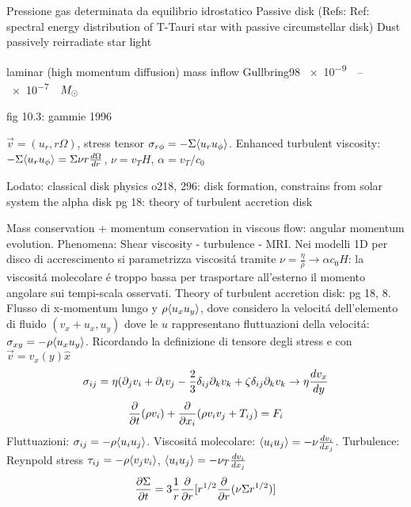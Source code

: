 \begin{workout}
	Pressione gas determinata da equilibrio idrostatico
	Passive disk (Refs: Ref: spectral energy distribution of T-Tauri star with passive circumstellar disk)	Dust passively reirradiate star light
\end{workout}

\begin{workout}
	laminar (high momentum diffusion)
	mass inflow Gullbring98 \SIrange{e-9}{e-7}{\per\year}$\msun{}$
\end{workout}
\begin{workout}[MRI]
	fig 10.3:
	gammie 1996
\end{workout}

\begin{workout}
	$\vec{v}=(u_r,r\Omega)$, stress tensor $\sigma_{r\phi}=-\Sigma\exv{u_ru_{\phi}}$.
	Enhanced turbulent viscosity: $-\Sigma\exv{u_ru_{\phi}}=\Sigma\nu r\TDy{r}{\Omega}$, $\nu=v_TH$, $\alpha=v_T/c_0$
\end{workout}

\begin{workout}
	Lodato: classical disk physics
	o218, 296: disk formation, constrains from solar system
	the alpha disk pg 18: theory of turbulent accretion disk
\end{workout}


\begin{workout}
	Mass conservation + momentum conservation in viscous flow: angular momentum evolution. Phenomena: Shear viscosity - turbulence - MRI.
	Nei modelli 1D per disco di accrescimento si parametrizza viscosit\'a tramite $\nu=\frac{\eta}{\rho}\to\alpha c_0 H$: la viscosit\'a molecolare \'e troppo bassa  per trasportare all'esterno il momento angolare sui tempi-scala osservati.
	Theory of turbulent accretion disk: pg 18, 8.
	Flusso di x-momentum lungo y $\rho\exv{u_xu_y}$, dove considero la velocit\'a dell'elemento di fluido $(v_x+u_x,u_y)$ dove le $u$ rappresentano fluttuazioni della velocit\'a: $\sigma_{xy}=-\rho\exv{u_xu_y}$.
	Ricordando la definizione di tensore degli stress e con $\vec{v}=v_x(y)\hat{x}$
	\begin{equation}
	\sigma_{ij}=\eta(\partial_jv_i+\partial_iv_j-\frac{2}{3}\delta_{ij}\partial_kv_k+\zeta\delta_{ij}\partial_kv_k \to \eta\TDy{y}{v_x}
	\end{equation}
	\begin{equation}
	\PDof{t}(\rho v_i)+\PDof{x_i}(\rho v_iv_j+T_{ij})=F_i
	\end{equation}
	Fluttuazioni: $\sigma_{ij}=-\rho\exv{u_iu_j}$.
	Viscosit\'a molecolare: $\exv{u_iu_j}=-\nu\TDy{x_j}{v_i}$.
	Turbulence: Reynpold stress $\tau_{ij}=-\rho\exv{v_jv_i}$, $\exv{u_iu_j}=-\nu_T\TDy{x_j}{v_i}$
	\begin{equation}
	\PDy{t}{\Sigma}=3\frac{1}{r}\PDof{r}[r\expy{1/2}\PDof{r}(\nu\Sigma r\expy{1/2})]
	\end{equation}
\end{workout}

